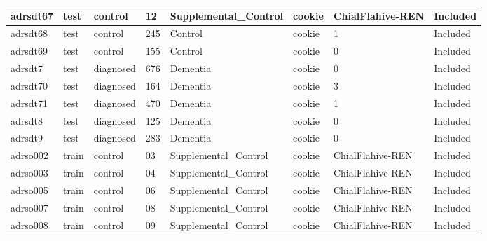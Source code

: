 \begin{center}
\begin{longtable}{|l|l|l|l|l|l|l|l|}
adrsdt67       & test                  & control           & 12                 & Supplemental\_Control & cookie          & ChialFlahive-REN & Included      \\ \hline
adrsdt68       & test                  & control           & 245                & Control              & cookie          & 1                & Included      \\ \hline
adrsdt69       & test                  & control           & 155                & Control              & cookie          & 0                & Included      \\ \hline
adrsdt7        & test                  & diagnosed         & 676                & Dementia             & cookie          & 0                & Included      \\ \hline
adrsdt70       & test                  & diagnosed         & 164                & Dementia             & cookie          & 3                & Included      \\ \hline
adrsdt71       & test                  & diagnosed         & 470                & Dementia             & cookie          & 1                & Included      \\ \hline
adrsdt8        & test                  & diagnosed         & 125                & Dementia             & cookie          & 0                & Included      \\ \hline
adrsdt9        & test                  & diagnosed         & 283                & Dementia             & cookie          & 0                & Included      \\ \hline
adrso002       & train                 & control           & 03                 & Supplemental\_Control & cookie          & ChialFlahive-REN & Included      \\ \hline
adrso003       & train                 & control           & 04                 & Supplemental\_Control & cookie          & ChialFlahive-REN & Included      \\ \hline
adrso005       & train                 & control           & 06                 & Supplemental\_Control & cookie          & ChialFlahive-REN & Included      \\ \hline
adrso007       & train                 & control           & 08                 & Supplemental\_Control & cookie          & ChialFlahive-REN & Included      \\ \hline
adrso008       & train                 & control           & 09                 & Supplemental\_Control & cookie          & ChialFlahive-REN & Included      \\ \hline

\end{longtable}
\end{center}
